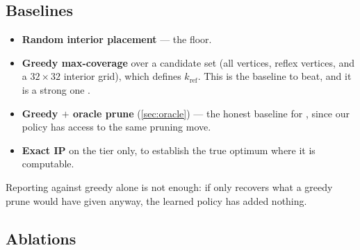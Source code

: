 \documentclass[11pt,a4paper]{article}
\begin{document}
\subsection{Baselines}

\begin{itemize}
  \item \textbf{Random interior placement} --- the floor.
  \item \textbf{Greedy max-coverage} over a candidate set (all vertices, reflex vertices, and
        a $32\times32$ interior grid), which defines $k_{\mathrm{ref}}$. This is the baseline
        to beat, and it is a strong one \cite{nemhauser1978,feige1998,ghosh2010}.
  \item \textbf{Greedy $+$ oracle prune} (\cref{sec:oracle}) --- the honest baseline for
        \stageII{}, since our policy has access to the same pruning move.
  \item \textbf{Exact IP} \cite{couto2011,tozoni2016} on the  tier only, to
        establish the true optimum where it is computable.
\end{itemize}

Reporting against greedy alone is not enough: if \stageII{} only recovers what a greedy prune
would have given anyway, the learned policy has added nothing.

\subsection{Ablations}
\end{document}
